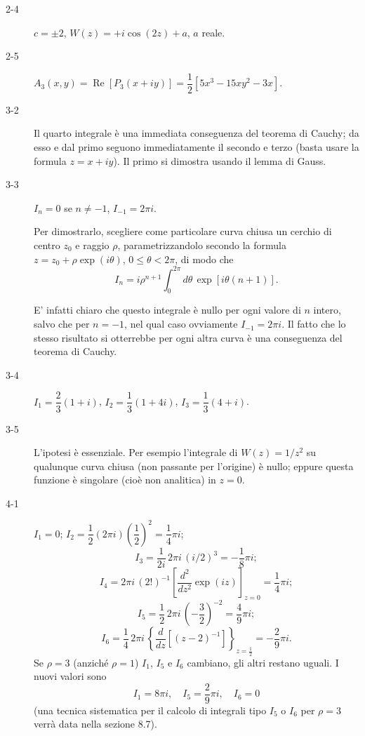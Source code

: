 \documentclass[11pt, a4paper]{book}
\numberwithin{equation}{section}
\begin{document}
\begin{description}
\item[2-4] $c = \pm 2$, \quad $W(z) = +i\cos(2z) + a$, $a$ reale.

\item[2-5] $A_3(x,y) = \operatorname{Re}\left[P_3(x+iy)\right] = \dfrac{1}{2}\left[5x^3 - 15xy^2 - 3x\right]$.

\item[3-2] Il quarto integrale è una immediata conseguenza del teorema di Cauchy; da esso e dal primo seguono immediatamente il secondo e terzo (basta usare la formula $z = x + iy$). Il primo si dimostra usando il lemma di Gauss.

\item[3-3] $I_n = 0$ se $n \neq -1$, \quad $I_{-1} = 2\pi i$.

Per dimostrarlo, scegliere come particolare curva chiusa un cerchio di centro $z_0$ e raggio $\rho$, parametrizzandolo secondo la formula $z = z_0 + \rho\exp(i\theta)$, $0 \leq \theta < 2\pi$, di modo che
$$I_n = i\rho^{n+1} \int_0^{2\pi} d\theta\, \exp\left[i\theta(n+1)\right].$$

E' infatti chiaro che questo integrale è nullo per ogni valore di $n$ intero, salvo che per $n = -1$, nel qual caso ovviamente $I_{-1} = 2\pi i$. Il fatto che lo stesso risultato si otterrebbe per ogni altra curva è una conseguenza del teorema di Cauchy.

\item[3-4] $I_1 = \dfrac{2}{3}(1+i)$, \quad $I_2 = \dfrac{1}{3}(1+4i)$, \quad $I_3 = \dfrac{1}{3}(4+i)$.

\item[3-5] L'ipotesi è essenziale. Per esempio l'integrale di $W(z) = 1/z^2$ su qualunque curva chiusa (non passante per l'origine) è nullo; eppure questa funzione è singolare (cioè non analitica) in $z = 0$.

\item[4-1] $I_1 = 0$; \quad $I_2 = \dfrac{1}{2}(2\pi i)\left(\dfrac{1}{2}\right)^2 = \dfrac{1}{4}\pi i$;
$$I_3 = \frac{1}{2i}\,2\pi i\,(i/2)^3 = -\frac{1}{8}\pi i;$$
$$I_4 = 2\pi i\,(2!)^{-1}\left[\frac{d^2}{dz^2}\exp(iz)\right]_{z=0} = \frac{1}{4}\pi i;$$
$$I_5 = \frac{1}{2}\,2\pi i\,\left(-\frac{3}{2}\right)^{-2} = \frac{4}{9}\pi i;$$
$$I_6 = \frac{1}{4}\,2\pi i\,\left\{\frac{d}{dz}\left[(z-2)^{-1}\right]\right\}_{z=\frac{1}{2}} = -\frac{2}{9}\pi i.$$
Se $\rho = 3$ (anziché $\rho = 1$) $I_1$, $I_5$ e $I_6$ cambiano, gli altri restano uguali. I nuovi valori sono
$$I_1 = 8\pi i, \quad I_5 = \frac{2}{9}\pi i, \quad I_6 = 0$$
(una tecnica sistematica per il calcolo di integrali tipo $I_5$ o $I_6$ per $\rho = 3$ verrà data nella sezione 8.7).


\end{description}
\end{document}
